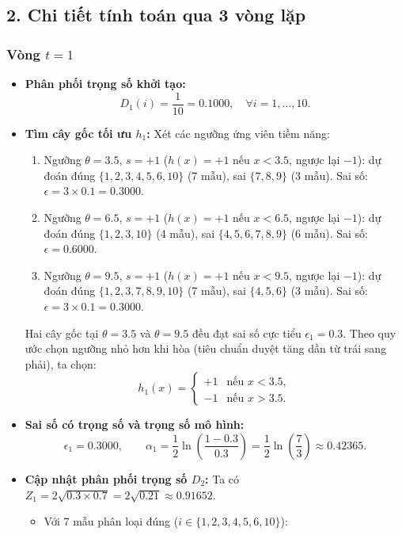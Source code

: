 \documentclass[11pt, a4paper]{article}
\begin{document}
\subsection*{2. Chi tiết tính toán qua 3 vòng lặp}

\subsubsection*{Vòng $t = 1$}
\begin{itemize}
    \item \textbf{Phân phối trọng số khởi tạo:}
    \[
    D_1(i) = \frac{1}{10} = 0.1000, \quad \forall i = 1, \dots, 10.
    \]
    \item \textbf{Tìm cây gốc tối ưu $h_1$:} Xét các ngưỡng ứng viên tiềm năng:
    \begin{enumerate}
        \item Ngưỡng $\theta = 3.5$, $s = +1$ ($h(x) = +1$ nếu $x < 3.5$, ngược lại $-1$): dự đoán đúng $\{1, 2, 3, 4, 5, 6, 10\}$ (7 mẫu), sai $\{7, 8, 9\}$ (3 mẫu). Sai số: $\epsilon = 3 \times 0.1 = 0.3000$.
        \item Ngưỡng $\theta = 6.5$, $s = +1$ ($h(x) = +1$ nếu $x < 6.5$, ngược lại $-1$): dự đoán đúng $\{1, 2, 3, 10\}$ (4 mẫu), sai $\{4, 5, 6, 7, 8, 9\}$ (6 mẫu). Sai số: $\epsilon = 0.6000$.
        \item Ngưỡng $\theta = 9.5$, $s = +1$ ($h(x) = +1$ nếu $x < 9.5$, ngược lại $-1$): dự đoán đúng $\{1, 2, 3, 7, 8, 9, 10\}$ (7 mẫu), sai $\{4, 5, 6\}$ (3 mẫu). Sai số: $\epsilon = 3 \times 0.1 = 0.3000$.
    \end{enumerate}
    Hai cây gốc tại $\theta = 3.5$ và $\theta = 9.5$ đều đạt sai số cực tiểu $\epsilon_1 = 0.3$. Theo quy ước chọn ngưỡng nhỏ hơn khi hòa (tiêu chuẩn duyệt tăng dần từ trái sang phải), ta chọn:
    \[
    h_1(x) = \begin{cases} +1 & \text{nếu } x < 3.5, \\ -1 & \text{nếu } x > 3.5. \end{cases}
    \]
    \item \textbf{Sai số có trọng số và trọng số mô hình:}
    \[
    \epsilon_1 = 0.3000, \qquad \alpha_1 = \frac{1}{2}\ln\left(\frac{1 - 0.3}{0.3}\right) = \frac{1}{2}\ln\left(\frac{7}{3}\right) \approx 0.42365.
    \]
    \item \textbf{Cập nhật phân phối trọng số $D_2$:}
    Ta có $Z_1 = 2\sqrt{0.3 \times 0.7} = 2\sqrt{0.21} \approx 0.91652$.
    \begin{itemize}
        \item Với 7 mẫu phân loại đúng ($i \in \{1, 2, 3, 4, 5, 6, 10\}$):

\end{itemize}
\end{itemize}
\end{document}
